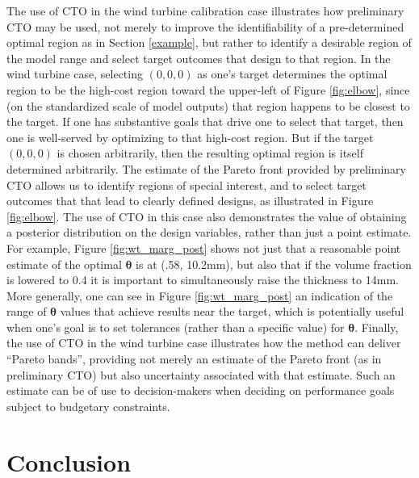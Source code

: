 \documentclass[12pt]{article}
\begin{document}
The use of CTO in the wind turbine calibration case illustrates how preliminary CTO may be used, not merely to improve the identifiability of a pre-determined optimal region as in Section \ref{example}, but rather to identify a desirable region of the model range and select target outcomes that design to that region.
%
In the wind turbine case, selecting $(0,0,0)$ as one's target determines the optimal region to be the high-cost region toward the upper-left of Figure \ref{fig:elbow}, since (on the standardized scale of model outputs) that region happens to be closest to the target.
%
If one has substantive goals that drive one to select that target, then one is well-served by optimizing to that high-cost region.
%
But if the target $(0,0,0)$ is chosen arbitrarily, then the resulting optimal region is itself determined arbitrarily.
%
The estimate of the Pareto front provided by preliminary CTO allows us to identify regions of special interest, and to select target outcomes that that lead to clearly defined designs, as illustrated in Figure \ref{fig:elbow}.
%
The use of CTO in this case also demonstrates the value of obtaining a posterior distribution on the design variables, rather than just a point estimate.
%
For example, Figure \ref{fig:wt_marg_post} shows not just that a reasonable point estimate of the optimal $\boldsymbol\theta$ is at (.58, 10.2mm), but also that if the volume fraction is lowered to 0.4 it is important to simultaneously raise the thickness to 14mm.
%
More generally, one can see in Figure \ref{fig:wt_marg_post} an indication of the range of $\boldsymbol\theta$ values that achieve results near the target, which is potentially useful when one's goal is to set tolerances (rather than a specific value) for $\boldsymbol\theta$.
%
Finally, the use of CTO in the wind turbine case illustrates how the method can deliver ``Pareto bands'', providing not merely an estimate of the Pareto front (as in preliminary CTO) but also uncertainty associated with that estimate.
%
Such an estimate can be of use to decision-makers when deciding on performance goals subject to budgetary constraints.




\section{Conclusion} \label{conclusion}
\end{document}
